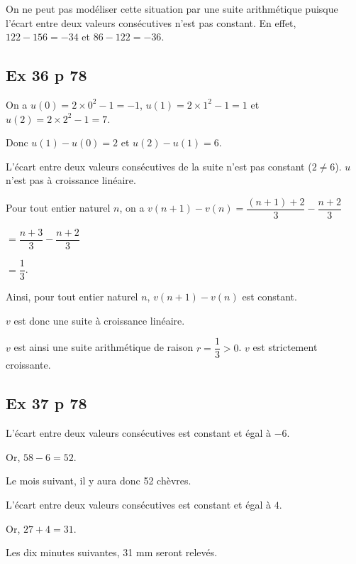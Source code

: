 \documentclass[12pt,a4paper]{book}
\begin{document}
On ne peut pas modéliser cette situation par une suite arithmétique puisque l’écart entre deux valeurs consécutives n’est pas constant. En effet, $122-156=-34$ et $86-122=-36$.

\subsection*{Ex 36 p 78}


\begin{enumMet}
	\item On a $u\left(0\right)=2 \times 0^2-1=-1$, $u\left(1\right)=2 \times 1^2-1=1$ et $u\left(2\right)=2 \times 2^2-1=7$.
	
	Donc $u\left(1\right)-u\left(0\right)=2$ et $u\left(2\right)-u\left(1\right)=6$.
	
	L’écart entre deux valeurs consécutives de la suite n’est pas constant ($2 \neq 6$). $u$ n’est pas à croissance linéaire.
	\item Pour tout entier naturel $n$, on a $v\left(n+1\right)-v\left(n\right)=\dfrac{\left(n+1\right)+2}{3}-\dfrac{n+2}{3}$ 
	
	$=\dfrac{n+3}{3}-\dfrac{n+2}{3}$
	
	$=\dfrac{1}{3}$.
	
	Ainsi, pour tout entier naturel $n$, $v\left(n+1\right)-v\left(n\right)$ est constant.
	
	$v$ est donc une suite à croissance linéaire.
	
	
	
	$v$ est ainsi une suite arithmétique de raison $r=\dfrac{1}{3} >0$. $v$ est strictement croissante.
\end{enumMet}

\subsection*{Ex 37 p 78}


\begin{enumMet}
	\item L’écart entre deux valeurs consécutives est constant et égal à $-6$.
	
	Or, $58-6=52$.
	
	Le mois suivant, il y aura donc 52 chèvres. 
	\item L’écart entre deux valeurs consécutives est constant et égal à $4$.
	
	Or, $27+4=31$.
	
	Les dix minutes suivantes, 31 mm seront relevés.
\end{enumMet}
\end{document}
